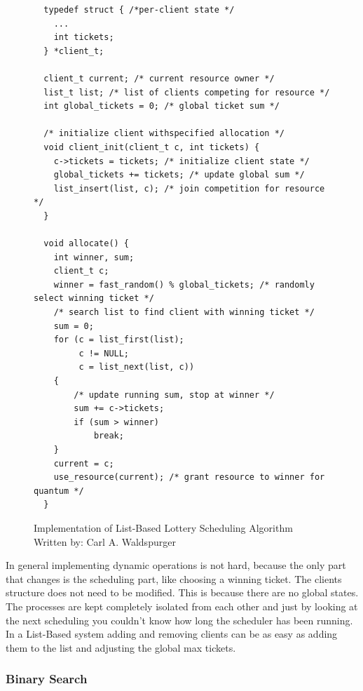 \newpage

\begin{figure}[H]
    \begin{verbatim}
  typedef struct { /*per-client state */
    ...
    int tickets;
  } *client_t;

  client_t current; /* current resource owner */
  list_t list; /* list of clients competing for resource */
  int global_tickets = 0; /* global ticket sum */

  /* initialize client withspecified allocation */
  void client_init(client_t c, int tickets) {
    c->tickets = tickets; /* initialize client state */ 
    global_tickets += tickets; /* update global sum */
    list_insert(list, c); /* join competition for resource */
  }

  void allocate() {
    int winner, sum;
    client_t c;
    winner = fast_random() % global_tickets; /* randomly select winning ticket */
    /* search list to find client with winning ticket */
    sum = 0;
    for (c = list_first(list);
         c != NULL;
         c = list_next(list, c))
    {
        /* update running sum, stop at winner */
        sum += c->tickets;
        if (sum > winner)
            break;
    }
    current = c;
    use_resource(current); /* grant resource to winner for quantum */
  }
    \end{verbatim}
    \caption{Implementation of List-Based Lottery Scheduling Algorithm\\Written by: Carl A. Waldspurger \cite{waldspurger95}}
    \label{code:lottery-sched}
\end{figure}

In general implementing dynamic operations is not hard, because the only part that changes is the scheduling part, like choosing a winning ticket.
The clients structure does not need to be modified.
This is because there are no global states. The processes are kept completely isolated from each other and just by looking at the next scheduling you couldn't know how long the scheduler has been running.
In a List-Based system adding and removing clients can be as easy as adding them to the list and adjusting the global max tickets.


\subsubsection{Binary Search}

